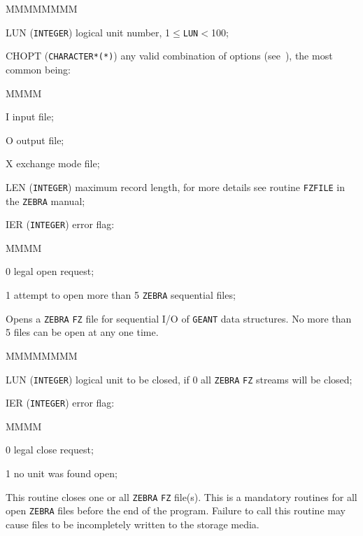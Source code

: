          
         

\begin{DLtt}{MMMMMMMM}
\item[LUN] ({\tt INTEGER}) logical unit number, 1$\leq${\tt LUN}$<$100;
\item[CHOPT] ({\tt CHARACTER*(*)}) any valid combination of
 options (see~\cite{bib-ZEBRAFZ,bib-ZEBRA}), the most common
being:
\begin{DLtt}{MMMM}
\item[I] input file;
\item[O] output file;
\item[X] exchange mode file;
\end{DLtt}
\item[LEN] ({\tt INTEGER}) maximum record length,
for more details see routine {\tt FZFILE} in the {\tt ZEBRA} manual;
\item[IER] ({\tt INTEGER}) error flag:
\begin{DLtt}{MMMM}
\item[0] legal open request;
\item[1] attempt to open more than 5 {\tt ZEBRA} sequential files;
\end{DLtt}
\end{DLtt}
Opens a {\tt ZEBRA} {\tt FZ} file for sequential I/O of {\tt GEANT}
data structures. No more than 5 files can be open at any one time.

\begin{DLtt}{MMMMMMMM}
\item[LUN] ({\tt INTEGER}) logical unit to be closed, if 0 all {\tt ZEBRA}
{\tt FZ} streams will be closed;
\item[IER] ({\tt INTEGER}) error flag:
\begin{DLtt}{MMMM}
\item[0] legal close request;
\item[1] no unit was found open;
\end{DLtt}
\end{DLtt}
This routine closes one or all {\tt ZEBRA} {\tt FZ} file(s). This is a 
mandatory routines for all open {\tt ZEBRA} files before the end of the
program. Failure to call this routine may cause files to be incompletely
written to the storage media.
 
 
